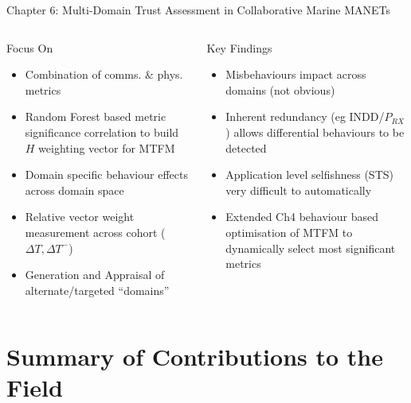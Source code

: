 \documentclass[aspectratio=43]{beamer}
\begin{document}
\begin{frame}{Chapter 6: Multi-Domain Trust Assessment in Collaborative Marine MANETs}
	\begin{columns}
		\begin{column}{0.5\textwidth}
			\begin{block}{Focus On}
				\begin{itemize}
					\item Combination of comms. \& phys. metrics
					\item Random Forest based metric significance correlation to build $H$ weighting vector for MTFM
					\item Domain specific behaviour effects across domain space
					\item Relative vector weight measurement across cohort ($\Delta T, \Delta T^-$)
					\item Generation and Appraisal of alternate/targeted ``domains''
				\end{itemize}
			\end{block}
		\end{column}
		\begin{column}{0.5\textwidth}
			\begin{exampleblock}{Key Findings}
				\begin{itemize}
					\item Misbehaviours impact across domains (not obvious) \hyperlink{fig:alternate_domain_diag}{}
					\item Inherent redundancy (eg INDD/$P_{RX}$) allows differential behaviours to be detected \hyperlink{fig:positive_heat}{}
					\item Application level selfishness (STS) very difficult to automatically 
					\item Extended Ch4 behaviour based optimisation of MTFM to dynamically select most significant metrics
				\end{itemize}
			\end{exampleblock}
		\end{column}
	\end{columns}
\end{frame}



\section*{Summary of Contributions to the Field}
\end{document}
